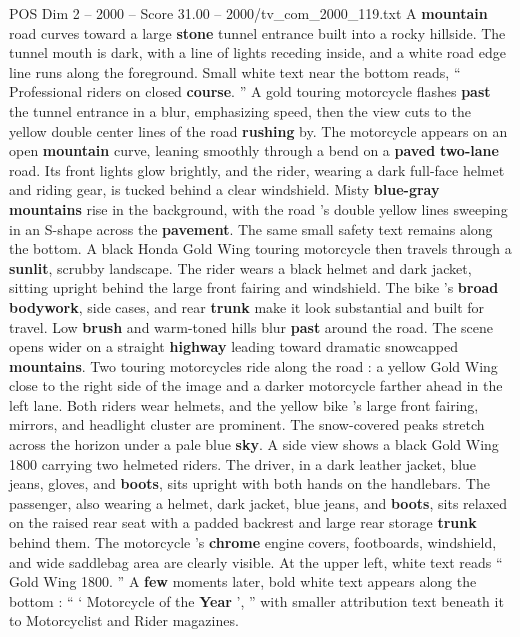 \begin{textsample}{POS Dim 2 – 2000 – Score 31.00 – 2000/tv\_com\_2000\_119.txt}  \label{ex:f2_pos_021}
A \textbf{mountain} road curves toward a large \textbf{stone} tunnel entrance built into a rocky hillside.
The tunnel mouth is dark, with a line of lights receding inside, and a white road edge line runs along the foreground.
Small white text near the bottom reads, “ Professional riders on closed \textbf{course}. ” A gold touring motorcycle flashes \textbf{past} the tunnel entrance in a blur, emphasizing speed, then the view cuts to the yellow double center lines of the road \textbf{rushing} by.
The motorcycle appears on an open \textbf{mountain} curve, leaning smoothly through a bend on a \textbf{paved} \textbf{two-lane} road.
Its front lights glow brightly, and the rider, wearing a dark full-face helmet and riding gear, is tucked behind a clear windshield.
Misty \textbf{blue-gray} \textbf{mountains} rise in the background, with the road ’s double yellow lines sweeping in an S-shape across the \textbf{pavement}.
The same small safety text remains along the bottom.
A black Honda Gold Wing touring motorcycle then travels through a \textbf{sunlit}, scrubby landscape.
The rider wears a black helmet and dark jacket, sitting upright behind the large front fairing and windshield.
The bike ’s \textbf{broad} \textbf{bodywork}, side cases, and rear \textbf{trunk} make it look substantial and built for travel.
Low \textbf{brush} and warm-toned hills blur \textbf{past} around the road.
The scene opens wider on a straight \textbf{highway} leading toward dramatic snowcapped \textbf{mountains}.
Two touring motorcycles ride along the road : a yellow Gold Wing close to the right side of the image and a darker motorcycle farther ahead in the left lane.
Both riders wear helmets, and the yellow bike ’s large front fairing, mirrors, and headlight cluster are prominent.
The snow-covered peaks stretch across the horizon under a pale blue \textbf{sky}.
A side view shows a black Gold Wing 1800 carrying two helmeted riders.
The driver, in a dark leather jacket, blue jeans, gloves, and \textbf{boots}, sits upright with both hands on the handlebars.
The passenger, also wearing a helmet, dark jacket, blue jeans, and \textbf{boots}, sits relaxed on the raised rear seat with a padded backrest and large rear storage \textbf{trunk} behind them.
The motorcycle ’s \textbf{chrome} engine covers, footboards, windshield, and wide saddlebag area are clearly visible.
At the upper left, white text reads “ Gold Wing 1800. ” A \textbf{few} moments later, bold white text appears along the bottom : “ ‘ Motorcycle of the \textbf{Year} ’, ” with smaller attribution text beneath it to Motorcyclist and Rider magazines.

\end{textsample}
